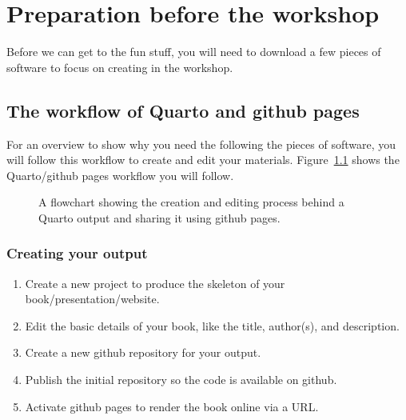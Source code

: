 \documentclass[
  letterpaper,
  DIV=11,
  numbers=noendperiod]{scrreprt}
\begin{document}

\chapter{Preparation before the workshop}\label{workshop_prep}

Before we can get to the fun stuff, you will need to download a few
pieces of software to focus on creating in the workshop.

\section{The workflow of Quarto and github
pages}\label{the-workflow-of-quarto-and-github-pages}

For an overview to show why you need the following the pieces of
software, you will follow this workflow to create and edit your
materials. Figure~\ref{fig-img-workflow} shows the Quarto/github pages
workflow you will follow.

\begin{figure}


\caption{\label{fig-img-workflow}A flowchart showing the creation and
editing process behind a Quarto output and sharing it using github
pages.}

\end{figure}%

\subsection{Creating your output}\label{creating-your-output}

\begin{enumerate}
\def\labelenumi{\arabic{enumi}.}
\item
  Create a new project to produce the skeleton of your
  book/presentation/website.
\item
  Edit the basic details of your book, like the title, author(s), and
  description.
\item
  Create a new github repository for your output.
\item
  Publish the initial repository so the code is available on github.
\item
  Activate github pages to render the book online via a URL.
\end{enumerate}
\end{document}
